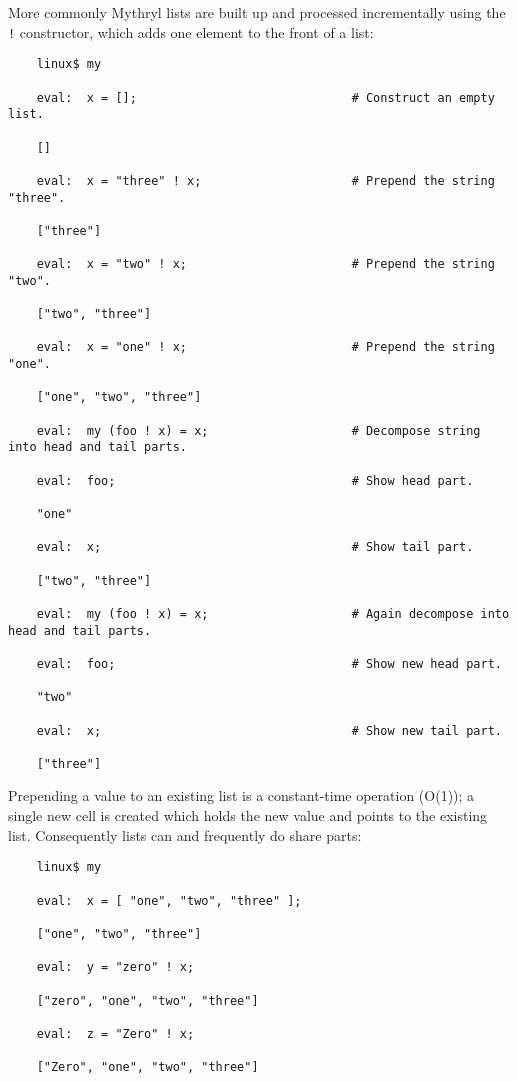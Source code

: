 More commonly Mythryl lists are built up and processed incrementally 
using the {\tt !} constructor, which adds one element to the front 
of a list:

\begin{verbatim}
    linux$ my

    eval:  x = [];                              # Construct an empty list.

    []

    eval:  x = "three" ! x;                     # Prepend the string "three".

    ["three"]

    eval:  x = "two" ! x;                       # Prepend the string "two".

    ["two", "three"]

    eval:  x = "one" ! x;                       # Prepend the string "one".

    ["one", "two", "three"]

    eval:  my (foo ! x) = x;                    # Decompose string into head and tail parts.

    eval:  foo;                                 # Show head part.

    "one"

    eval:  x;                                   # Show tail part.

    ["two", "three"]

    eval:  my (foo ! x) = x;                    # Again decompose into head and tail parts.

    eval:  foo;                                 # Show new head part.

    "two"

    eval:  x;                                   # Show new tail part.

    ["three"]
\end{verbatim}

Prepending a value to an existing list is a constant-time operation (O(1));  a 
single new cell is created which holds the new value and points to the existing 
list.  Consequently lists can and frequently do share parts:

\begin{verbatim}
    linux$ my

    eval:  x = [ "one", "two", "three" ];

    ["one", "two", "three"]

    eval:  y = "zero" ! x;

    ["zero", "one", "two", "three"]

    eval:  z = "Zero" ! x;

    ["Zero", "one", "two", "three"]
\end{verbatim}

